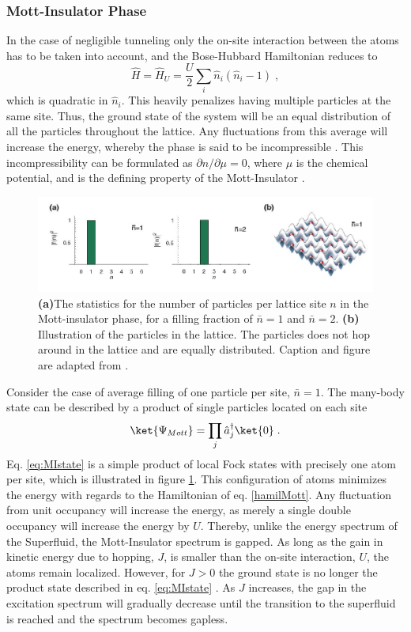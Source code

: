 \subsubsection{Mott-Insulator Phase}
In the case of negligible tunneling only the on-site interaction between the atoms has to be taken into account, and the Bose-Hubbard Hamiltonian reduces to
\begin{equation}
	\hat{H} = \hat{H}_U = \frac{U}{2} \sum_{i} \hat{n}_i \left( \hat{n}_i -1 \right) \; ,
	\label{hamilMott}
\end{equation}
which is quadratic in $\hat{n}_i$. This heavily penalizes having multiple particles at the same site. Thus, the ground state of the system will be an equal distribution of all the particles throughout the lattice. Any fluctuations from this average will increase the energy, whereby the phase is said to be incompressible \cite{Gemelke2009}. This incompressibility can be formulated as $\partial n / \partial \mu = 0$, where $\mu$ is the chemical potential, and is the defining property of the Mott-Insulator \cite{manybodyBloch}.\\
\begin{figure}[!h]
\centering
\includegraphics[width=0.8\columnwidth]{Figures/f(n)_M.JPG} 
\caption{\textbf{(a)}The statistics for the number of particles per lattice site $n$ in the Mott-insulator phase, for a filling fraction of $\bar{n}=1$ and $\bar{n}=2$. \textbf{(b)} Illustration of the particles in the lattice. The particles does not hop around in the lattice and are equally distributed. Caption and figure are adapted from \cite{greiner}.}
\label{fig:f(n)_M} 
\end{figure}
Consider the case of average filling of one particle per site, $\bar{n} = 1$. The many-body state can be described by a product of single particles located on each site \cite{manybodyBloch}
\begin{equation}
	\ket{\Psi_{Mott}} = \prod_j \hat{a}_{j}^{\dag} \ket{0} \; .
	\label{eq:MIstate}
\end{equation}
Eq. \ref{eq:MIstate} is a simple product of local Fock states with precisely one atom per site, which is illustrated in figure \ref{fig:f(n)_M}. This configuration of atoms minimizes the energy with regards to the Hamiltonian of eq. \eqref{hamilMott}. Any fluctuation from unit occupancy will increase the energy, as merely a single double occupancy will increase the energy by $U$. Thereby, unlike the energy spectrum of the Superfluid, the Mott-Insulator spectrum is gapped. As long as the gain in kinetic energy due to hopping, $J$, is smaller than the on-site interaction, $U$, the atoms remain localized. However, for $J > 0$ the ground state is no longer the product state described in eq. \eqref{eq:MIstate} \cite{manybodyBloch}. As $J$ increases, the gap in the excitation spectrum will gradually decrease until the transition to the superfluid is reached and the spectrum becomes gapless.\\
